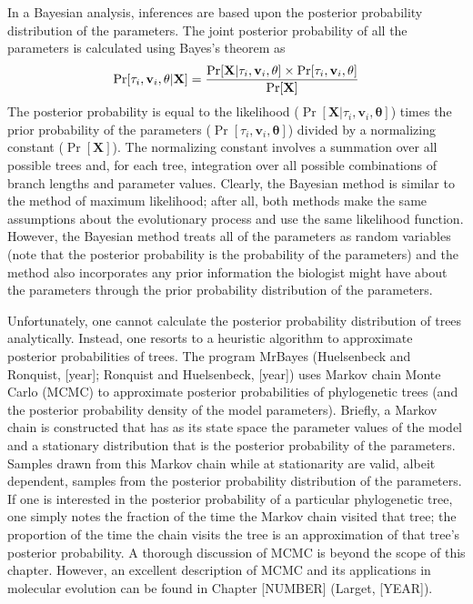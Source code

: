 \documentclass{svmult}
\begin{document}
In a Bayesian analysis, inferences are based upon the posterior probability distribution of the parameters. The joint posterior
probability of all the parameters  is calculated using Bayes's theorem as
$$
\Pr[\tau_i, {\mathbf v}_i, {\mathbf \theta} | {\mathbf X}] = 
{\Pr[ {\mathbf X} |  \tau_i, {\mathbf v}_i, {\mathbf \theta} ] \times \Pr[\tau_i, {\mathbf v}_i, {\mathbf \theta}]
 \over 
\Pr[ {\mathbf X}] }
$$
The posterior probability is equal to the likelihood ($\Pr[ {\mathbf X} |  \tau_i, {\mathbf v}_i, {\mathbf \theta} ]$) times the prior probability of the parameters ($\Pr[\tau_i, {\mathbf v}_i, {\mathbf \theta}]$) divided by a normalizing constant
($\Pr[ {\mathbf X}]$). The normalizing constant involves a summation over all possible trees and, for each tree, integration over all possible
combinations of branch lengths and parameter values. Clearly, the Bayesian method is similar to the method of maximum likelihood; after
all, both methods make the same assumptions about the evolutionary process and use the same likelihood function. However, the Bayesian
method treats all of the parameters as random variables (note that the posterior probability is the probability of the parameters) and the
method also incorporates any prior information the biologist might have about the parameters through the prior probability distribution of
the parameters.  

Unfortunately, one cannot calculate the posterior probability distribution of trees analytically. Instead, one resorts to a heuristic algorithm to
approximate posterior probabilities of trees. The program MrBayes (Huelsenbeck and Ronquist, [year]; Ronquist and Huelsenbeck, [year]) 
uses Markov chain Monte Carlo (MCMC) to approximate posterior probabilities
of phylogenetic trees (and the posterior probability density of the model parameters). Briefly, a Markov chain is constructed that has as its
state space the parameter values of the model and a stationary distribution that is the posterior probability of the parameters. Samples drawn
from this Markov chain while at stationarity are valid, albeit dependent, samples from the posterior probability distribution of the parameters. If
one is interested in the posterior probability of a particular phylogenetic tree, one simply notes the fraction of the time the Markov chain visited
that tree; the proportion of the time the chain visits the tree is an approximation of that tree's posterior probability. A thorough discussion of MCMC
is beyond the scope of this chapter. However, an excellent description of MCMC and its applications in molecular evolution can be found in
Chapter [NUMBER] (Larget, [YEAR]).
\end{document}

